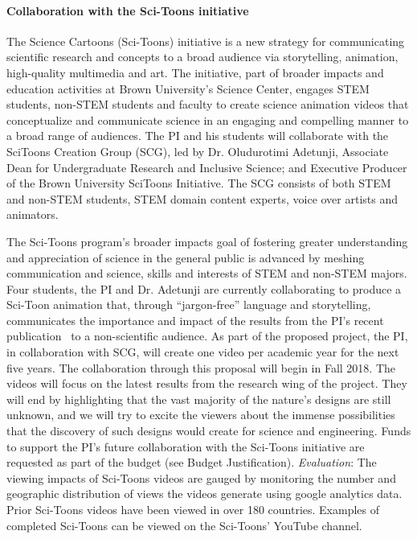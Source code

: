 \documentclass[10pt,letterpaper]{article}
\begin{document}
  \paragraph{Collaboration with the Sci-Toons initiative}
    The Science Cartoons (Sci-Toons) initiative is a new strategy for communicating scientific research and concepts to a broad audience via storytelling, animation, high-quality multimedia and art. The initiative, part of broader impacts and education activities at Brown University's Science Center, engages STEM students, non-STEM students and faculty to create science animation videos that conceptualize and communicate science in an engaging and compelling manner to a broad range of audiences. The PI and his students will collaborate with the SciToons Creation Group (SCG), led by Dr. Oludurotimi Adetunji, Associate Dean for Undergraduate Research and Inclusive Science; and Executive Producer of the Brown University SciToons Initiative. The SCG consists of both STEM and non-STEM students, STEM domain content experts, voice over artists and animators.

    The Sci-Toons program's broader impacts goal of fostering greater understanding and appreciation of science in the general public is advanced by meshing communication and science, skills and interests of STEM and non-STEM majors. Four students, the PI and Dr. Adetunji are currently collaborating to produce a Sci-Toon animation that, through ``jargon-free'' language and storytelling, communicates the importance and impact of the results from the PI's recent publication~\cite{monn2015new} to a non-scientific audience. As part of the proposed project, the PI, in collaboration with SCG, will create one video per academic year for the next five years. The collaboration through this proposal will begin in Fall 2018. The videos will focus on the latest results from the research wing of the project. They will end by highlighting that the vast majority of the nature's designs are still unknown, and we will try to excite the viewers about the immense possibilities that the discovery of such designs would create for science and engineering. Funds to support the PI's future collaboration with the Sci-Toons initiative are requested as part of the budget (see Budget Justification). \emph{Evaluation}: The viewing impacts of Sci-Toons videos are gauged by monitoring the number and geographic distribution of views the videos generate using google analytics data. Prior Sci-Toons videos have been viewed in over 180 countries. Examples of completed Sci-Toons can be viewed on the Sci-Toons' YouTube channel.
\end{document}
